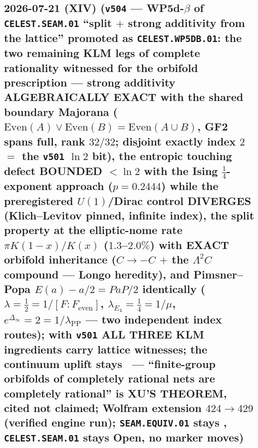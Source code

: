 \subsection*{2026-07-21 (XIV) (\texttt{v504} --- WP5d-$\beta$ of \texttt{CELEST.SEAM.01} ``split $+$ strong additivity from the lattice'' promoted as \texttt{CELEST.WP5DB.01}: the two remaining KLM legs of complete rationality witnessed for the orbifold prescription --- strong additivity ALGEBRAICALLY EXACT with the shared boundary Majorana ($\mathrm{Even}(A)\vee\mathrm{Even}(B)=\mathrm{Even}(A\cup B)$, GF2 spans full, rank $32/32$; disjoint exactly index $2$ $=$ the \texttt{v501} $\ln2$ bit), the entropic touching defect BOUNDED $<\ln2$ with the Ising $\tfrac14$-exponent approach ($p=0.2444$) while the preregistered $U(1)$/Dirac control DIVERGES (Klich--Levitov pinned, infinite index), the split property at the elliptic-nome rate $\pi K(1-x)/K(x)$ ($1.3$--$2.0\%$) with EXACT orbifold inheritance ($C\to-C$ $+$ the $\Lambda^2C$ compound --- Longo heredity), and Pimsner--Popa $E(a)-a/2=PaP/2$ identically ($\lambda=\tfrac12=1/[F{:}F_{\mathrm{even}}]$, $\lambda_{E_4}=\tfrac14=1/\mu$, $e^{\Delta_\infty}=2=1/\lambda_{\mathrm{PP}}$ --- two independent index routes); with \texttt{v501} ALL THREE KLM ingredients carry lattice witnesses; the continuum uplift stays \mO\ --- ``finite-group orbifolds of completely rational nets are completely rational'' is XU'S THEOREM, cited not claimed; Wolfram extension $424\to429$ (verified engine run); \texttt{SEAM.EQUIV.01} stays \mO, \texttt{CELEST.SEAM.01} stays Open, no marker moves)}
